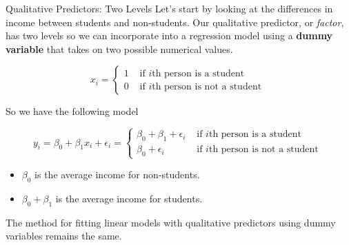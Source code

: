 \documentclass[
  ignorenonframetext,
  aspectratio=169,
]{beamer}
\begin{document}
\begin{frame}{Qualitative Predictors: Two Levels}
\protect\hypertarget{qualitative-predictors-two-levels}{}
Let's start by looking at the differences in income between students and
non-students. Our qualitative predictor, or \emph{factor}, has two
levels so we can incorporate into a regression model using a
\textbf{dummy variable} that takes on two possible numerical values.

\[
x_{i}=\left\{\begin{array}{ll}
1 & \text { if } i \text{th person is a student } \\
0 & \text { if } i \text{th person is not a student }
\end{array}\right. 
\]

So we have the following model

\[
y_{i}=\beta_{0}+\beta_{1} x_{i}+\epsilon_{i}=\left\{\begin{array}{ll}
\beta_{0}+\beta_{1}+\epsilon_{i} & \text { if } i \text{th person is a student } \\
\beta_{0}+\epsilon_{i} & \text { if } i \text{th person is not a student }
\end{array}\right.
\]

\begin{itemize}
\item
  \(\beta_0\) is the average income for non-students.
\item
  \(\beta_0 + \beta_1\) is the average income for students.
\end{itemize}

The method for fitting linear models with qualitative predictors using
dummy variables remains the same.
\end{frame}
\end{document}
